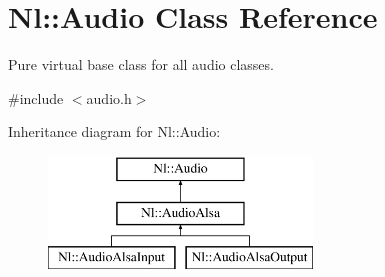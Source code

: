 \hypertarget{classNl_1_1Audio}{\section{Nl\-:\-:Audio Class Reference}
\label{classNl_1_1Audio}
}


Pure virtual base class for all audio classes.  




{\ttfamily \#include $<$audio.\-h$>$}

Inheritance diagram for Nl\-:\-:Audio\-:\begin{figure}[H]
\begin{center}
\leavevmode
\includegraphics[height=3.000000cm]{classNl_1_1Audio}
\end{center}
\end{figure}
